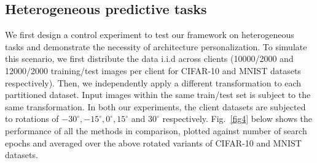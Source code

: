 \subsection{Heterogeneous predictive tasks} 
We first design a control experiment to test our framework on heterogeneous tasks and demonstrate the necessity of architecture personalization. To simulate this scenario, we first distribute the data i.i.d across clients (10000/2000 and 12000/2000 training/test images per client for CIFAR-10 and MNIST datasets respectively). Then, we independently apply a different transformation to each partitioned dataset. Input images within the same train/test set is subject to the same transformation. In both our experiments, the client datasets are subjected to rotations of $-30^{\circ}, -15^{\circ}, 0^{\circ}, 15^{\circ}$ and $30^{\circ}$ respectively. Fig.~\ref{fig4} below shows the performance of all the methods in comparison, plotted against number of search epochs and averaged over the above rotated variants of CIFAR-10 and MNIST datasets.


